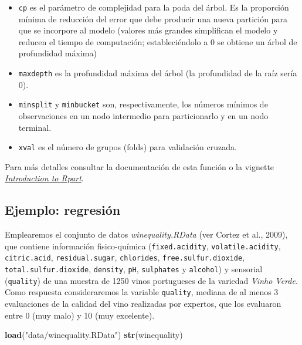 \documentclass[]{book}
\newenvironment{Shaded}{\begin{snugshade}}{\end{snugshade}}
\newcommand{\KeywordTok}[1]{\textcolor[rgb]{0.13,0.29,0.53}{\textbf{#1}}}
\newcommand{\StringTok}[1]{\textcolor[rgb]{0.31,0.60,0.02}{#1}}
\newcommand{\NormalTok}[1]{#1}
\theoremstyle{break}
\theoremstyle{definition}
\theoremstyle{definition}
\theoremstyle{definition}
\theoremstyle{remark}
\begin{document}
\begin{itemize}
  \begin{itemize}
  \item
    \texttt{cp} es el parámetro de complejidad para la poda del árbol.
    Es la proporción mínima de reducción del error que debe producir una
    nueva partición para que se incorpore al modelo (valores más grandes
    simplifican el modelo y reducen el tiempo de computación;
    estableciéndolo a 0 se obtiene un árbol de profundidad máxima)
  \item
    \texttt{maxdepth} es la profundidad máxima del árbol (la profundidad
    de la raíz sería 0).
  \item
    \texttt{minsplit} y \texttt{minbucket} son, respectivamente, los
    números mínimos de observaciones en un nodo intermedio para
    particionarlo y en un nodo terminal.
  \item
    \texttt{xval} es el número de grupos (folds) para validación
    cruzada.
  \end{itemize}
\end{itemize}

Para más detalles consultar la documentación de esta función o la
vignette
\href{https://cran.r-project.org/web/packages/rpart/vignettes/longintro.pdf}{\emph{Introduction
to Rpart}}.

\subsection{Ejemplo: regresión}\label{ejemplo-regresiuxf3n}

Emplearemos el conjunto de datos \emph{winequality.RData} (ver Cortez et
al., 2009), que contiene información fisico-química
(\texttt{fixed.acidity}, \texttt{volatile.acidity},
\texttt{citric.acid}, \texttt{residual.sugar}, \texttt{chlorides},
\texttt{free.sulfur.dioxide}, \texttt{total.sulfur.dioxide},
\texttt{density}, \texttt{pH}, \texttt{sulphates} y \texttt{alcohol}) y
sensorial (\texttt{quality}) de una muestra de 1250 vinos portugueses de
la variedad \emph{Vinho Verde}. Como respuesta consideraremos la
variable \texttt{quality}, mediana de al menos 3 evaluaciones de la
calidad del vino realizadas por expertos, que los evaluaron entre 0 (muy
malo) y 10 (muy excelente).

\begin{Shaded}
\begin{Highlighting}[]
\KeywordTok{load}\NormalTok{(}\StringTok{"data/winequality.RData"}\NormalTok{)}
\KeywordTok{str}\NormalTok{(winequality)}
\end{Highlighting}
\end{Shaded}
\end{document}
